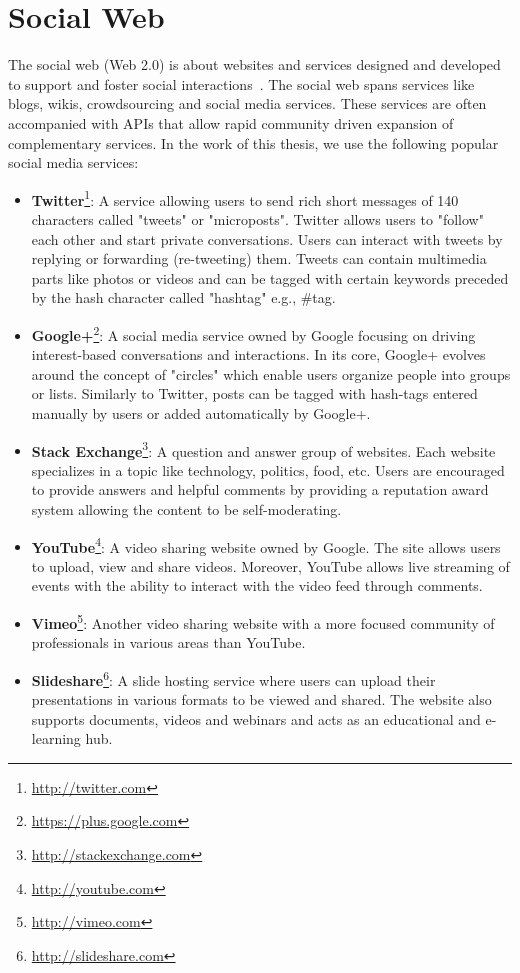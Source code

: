 \section{Social Web}\label{social-web}

The social web (Web 2.0) is about websites and services designed and developed to support and foster social interactions~\cite{Porter:NewRiders:08}. The social web spans services like blogs, wikis, crowdsourcing and social media services. These services are often accompanied with APIs that allow rapid community driven expansion of complementary services. In the work of this thesis, we use the following popular social media services:

\begin{itemize}
	\item \textbf{Twitter}\footnote{\url{http://twitter.com}}: A service allowing users to send rich short messages of 140 characters called "tweets" or "microposts". Twitter allows users to "follow" each other and start private conversations. Users can interact with tweets by replying or forwarding (re-tweeting) them. Tweets can contain multimedia parts like photos or videos and can be tagged with certain keywords preceded by the hash character called "hashtag" e.g., \#tag.
	\item \textbf{Google+}\footnote{\url{https://plus.google.com}}: A social media service owned by Google focusing on driving interest-based conversations and interactions. In its core, Google+ evolves around the concept of "circles" which enable users organize people into groups or lists. Similarly to Twitter, posts can be tagged with hash-tags entered manually by users or added automatically by Google+.
	\item \textbf{Stack Exchange}\footnote{\url{http://stackexchange.com}}: A question and answer group of websites. Each website specializes in a topic like technology, politics, food, etc. Users are encouraged to provide answers and helpful comments by providing a reputation award system allowing the content to be self-moderating.
	\item \textbf{YouTube}\footnote{\url{http://youtube.com}}: A video sharing website owned by Google. The site allows users to upload, view and share videos. Moreover, YouTube allows live streaming of events with the ability to interact with the video feed through comments.
	\item \textbf{Vimeo}\footnote{\url{http://vimeo.com}}: Another video sharing website with a more focused community of professionals in various areas than YouTube.
	\item \textbf{Slideshare}\footnote{\url{http://slideshare.com}}: A slide hosting service where users can upload their presentations in various formats to be viewed and shared. The website also supports documents, videos and webinars and acts as an educational and e-learning hub.
\end{itemize}

